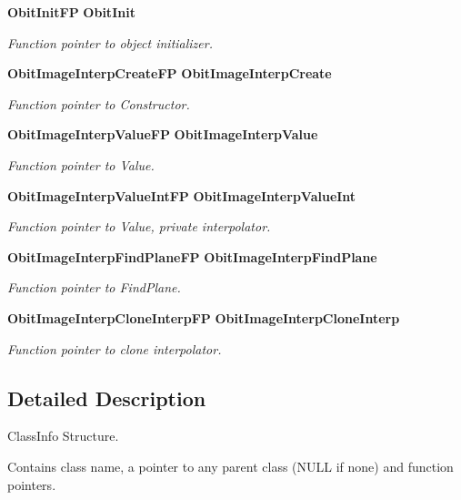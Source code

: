 \begin{CompactItemize}
{\bf Obit\-Init\-FP} {\bf Obit\-Init}
\begin{CompactList}\small\item\em Function pointer to object initializer. \item\end{CompactList}\item 
{\bf Obit\-Image\-Interp\-Create\-FP} {\bf Obit\-Image\-Interp\-Create}
\begin{CompactList}\small\item\em Function pointer to Constructor. \item\end{CompactList}\item 
{\bf Obit\-Image\-Interp\-Value\-FP} {\bf Obit\-Image\-Interp\-Value}
\begin{CompactList}\small\item\em Function pointer to Value. \item\end{CompactList}\item 
{\bf Obit\-Image\-Interp\-Value\-Int\-FP} {\bf Obit\-Image\-Interp\-Value\-Int}
\begin{CompactList}\small\item\em Function pointer to Value, private interpolator. \item\end{CompactList}\item 
{\bf Obit\-Image\-Interp\-Find\-Plane\-FP} {\bf Obit\-Image\-Interp\-Find\-Plane}
\begin{CompactList}\small\item\em Function pointer to Find\-Plane. \item\end{CompactList}\item 
{\bf Obit\-Image\-Interp\-Clone\-Interp\-FP} {\bf Obit\-Image\-Interp\-Clone\-Interp}
\begin{CompactList}\small\item\em Function pointer to clone interpolator. \item\end{CompactList}\end{CompactItemize}


\subsection{Detailed Description}
Class\-Info Structure. 

Contains class name, a pointer to any parent class (NULL if none) and function pointers. 



